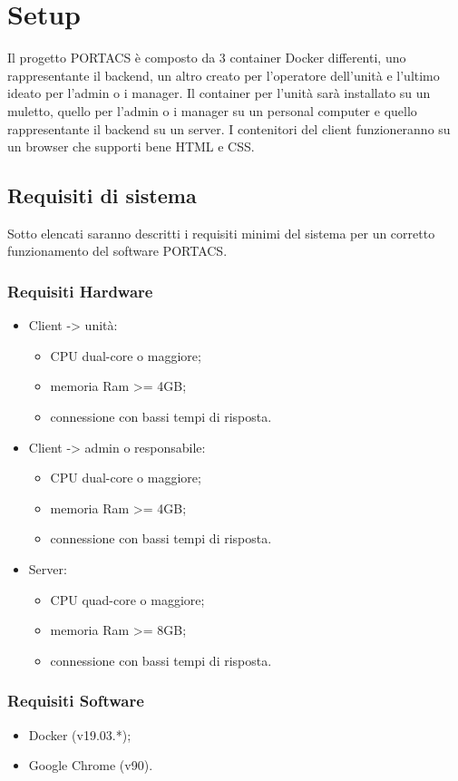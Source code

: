 \section{Setup}
Il progetto PORTACS è composto da 3 container Docker differenti, uno rappresentante il backend, un altro creato per l'operatore dell'unità e l'ultimo ideato per l'admin o i manager. Il container per l'unità sarà installato su un muletto, quello per l'admin o i manager su un personal computer e quello rappresentante il backend su un server. I contenitori del client funzioneranno su un browser che supporti bene HTML e CSS.


\subsection{Requisiti di sistema}
Sotto elencati saranno descritti i requisiti minimi del sistema per un corretto funzionamento del software PORTACS.


\subsubsection{Requisiti Hardware}
\begin{itemize}
	\item Client -> unità:
\begin{itemize}
	\item CPU dual-core o maggiore;
	\item memoria Ram >= 4GB;
	\item connessione con bassi tempi di risposta.
\end{itemize}
	\item Client -> admin o responsabile:
\begin{itemize}
	\item CPU dual-core o maggiore;
	\item memoria Ram >= 4GB;
	\item connessione con bassi tempi di risposta.
\end{itemize}
	\item Server:
\begin{itemize}
	\item CPU quad-core o maggiore;
	\item memoria Ram >= 8GB;
	\item connessione con bassi tempi di risposta.
\end{itemize}
\end{itemize}

\subsubsection{Requisiti Software}
    \begin{itemize}
        \item Docker (v19.03.*);
        \item Google Chrome (v90).
    \end{itemize}

